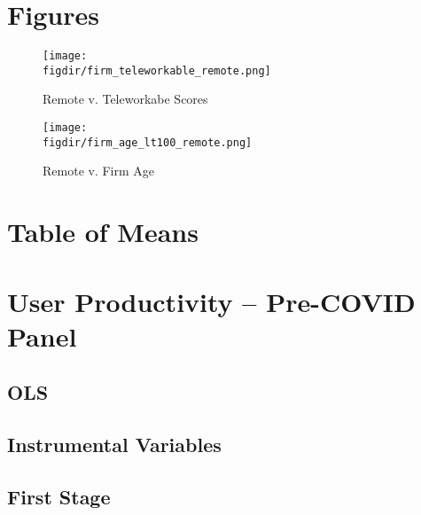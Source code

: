 \documentclass{article}
\newcommand{\cleanedresultsdir}{../../results/cleaned}
\newcommand{\figdir}{../../results/figures}
\begin{document}


\section{Figures}

\begin{figure}[H]
  \centering
  \texttt{[image: \\figdir/firm\_teleworkable\_remote.png]}
  \caption{Remote v. Teleworkabe Scores}
\end{figure}



\begin{figure}[H]
  \centering
  \texttt{[image: \\figdir/firm\_age\_lt100\_remote.png]}
  \caption{Remote v. Firm Age}
\end{figure}



\section{Table of Means}
%
\section{User Productivity – Pre-COVID Panel}

\subsection{OLS}


\subsection{Instrumental Variables}


\subsection{First Stage}

\end{document}
